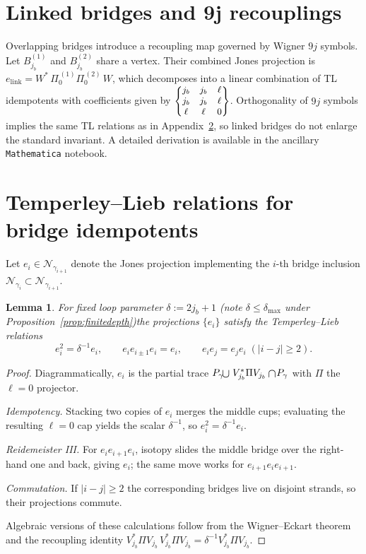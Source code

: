 \documentclass[11pt]{article}
\newtheorem{lemma}{Lemma}[section]
\begin{document}
\section{Linked bridges and 9j recouplings}\label{app:9j}

Overlapping bridges introduce a recoupling map governed by
Wigner $9j$ symbols.
Let $B_{j_b}^{(1)}$ and $B_{j_b}^{(2)}$ share a vertex.
Their combined Jones projection is
$e_{\mathrm{link}} = W^{*}\,\Pi_0^{\,(1)}\Pi_0^{\,(2)}\,W$,
which decomposes into a linear combination of TL idempotents
with coefficients given by ${\small\begin{Bmatrix}j_b&j_b&\ell\\ j_b&j_b&\ell\\ \ell&\ell&0\end{Bmatrix}}$.
Orthogonality of $9j$ symbols implies the same TL
relations as in Appendix~\ref{app:TL}, so linked bridges do not enlarge the
standard invariant.
A detailed derivation is available in the ancillary \texttt{Mathematica} notebook.

\appendix
\section{Temperley--Lieb relations for bridge idempotents}\label{app:TL}

Let $e_i\in\mathcal N_{\gamma_{i+1}}$ denote the Jones projection 
implementing the $i$-th bridge inclusion 
$\mathcal N_{\gamma_i}\subset\mathcal N_{\gamma_{i+1}}$.

\begin{lemma}
For fixed loop parameter $\delta := 2j_b+1$ (note $\delta\le\delta_{\max}$ under Proposition~\ref{prop:finitedepth})\;the projections $\{e_i\}$
satisfy the Temperley--Lieb relations
\[
  e_i^2 = \delta^{-1} e_i,\qquad
  e_i e_{i\pm1} e_i = e_i,\qquad
  e_i e_j = e_j e_i\;( |i-j|\ge 2).
\]
\end{lemma}

\begin{proof}
Diagrammatically, $e_i$ is the partial trace
\(
  \smash{P_\gamma\!\mathbin{\raisebox{-0.3ex}{\scalebox{1.2}{$\cup$}}}}
  \;V_{j_b}^{*}\Pi V_{j_b}
  \mathbin{\raisebox{-0.3ex}{\scalebox{1.2}{$\cap$}}}\!P_\gamma
\)
with $\Pi$ the $\ell=0$ projector.  

\emph{Idempotency.}  
Stacking two copies of $e_i$ merges the middle cups; 
evaluating the resulting $\ell=0$ cap yields the scalar $\delta^{-1}$, 
so $e_i^2=\delta^{-1}e_i$.

\emph{Reidemeister III.}  
For $e_ie_{i+1}e_i$, isotopy slides the middle bridge over the right‐hand one
and back, giving $e_i$; the same move works for $e_{i+1}e_ie_{i+1}$.

\emph{Commutation.}  
If $|i-j|\ge2$ the corresponding bridges live on disjoint strands, so their
projections commute.

Algebraic versions of these calculations follow from the 
Wigner--Eckart theorem and the recoupling identity 
$V_{j_b}^{*}\Pi V_{j_b}\,V_{j_b}^{*}\Pi V_{j_b}= \delta^{-1} V_{j_b}^{*}\Pi V_{j_b}$.
\end{proof}
\end{document}
